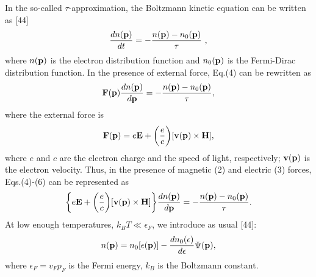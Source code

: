 \documentclass[prl,aps,showpacs,twocolumn,floatfix]{revtex4}
\begin{document}
In the so-called $\tau$-approximation, the Boltzmann kinetic
equation can be written as [44]
\begin{equation}
\frac{d n({\bf p})}{dt}= - \frac{n({\bf p})-n_0({\bf p})}{\tau} \
,
\end{equation}
where $n({\bf p})$ is the electron distribution function and
$n_0({\bf p})$ is the Fermi-Dirac distribution function. In the
presence of external force, Eq.(4) can be rewritten as
\begin{equation}
{\bf F}({\bf p}) \frac{d n({\bf p})}{d {\bf p}} = - \frac{n({\bf
p})-n_0({\bf p})}{\tau},
\end{equation}
where the external force is
\begin{equation}
{\bf F}({\bf p}) =  e {\bf E}+\biggl( \frac{e}{c} \biggl) [{\bf
v(p)} \times {\bf H}],
\end{equation}
where $e$ and $c$ are the electron charge and the speed of light,
respectively; ${\bf v(p)}$ is the electron velocity. Thus, in the
presence of magnetic (2) and electric (3) forces, Eqs.(4)-(6) can
be represented as
\begin{equation}
\biggl\{ e{\bf E} + \biggl( \frac{e}{c} \biggl) [{\bf v(p)} \times
{\bf H}] \biggl\} \frac{d n({\bf p})}{d {\bf p}} = - \frac{n({\bf
p})-n_0({\bf p})}{\tau}.
\end{equation}
At low enough temperatures, $k_B T \ll \epsilon_F$, we introduce
as usual [44]:
\begin{equation}
n({\bf p})=n_0[\epsilon({\bf p})] - \frac{d n_0(\epsilon)}{d
\epsilon}\Psi ({\bf p}),
\end{equation}
where $\epsilon_F =v_F p_F$ is the Fermi energy, $k_B$ is the
Boltzmann constant.
\end{document}
